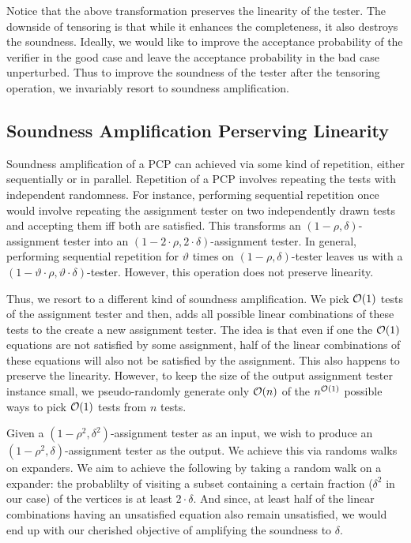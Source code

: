 \noindent Notice that the above transformation preserves the linearity
of the tester. The downside of tensoring is that while it enhances the
completeness, it also destroys the soundness. Ideally, we would like
to improve the acceptance probability of the verifier in the good case
and leave the acceptance probability in the bad case unperturbed. Thus
to improve the soundness of the tester after the tensoring operation,
we invariably resort to soundness amplification.

\subsection{Soundness Amplification Perserving Linearity}
Soundness amplification of a PCP can achieved via some kind of
repetition, either sequentially or in parallel. Repetition of a PCP
involves repeating the tests with independent randomness. For
instance, performing sequential repetition once would involve 
repeating the assignment tester on two independently drawn tests 
and accepting them iff both are satisfied. This transforms an $(1 - \rho,
\delta)$-assignment tester into an $(1 - 2 \cdot \rho ,2 \cdot
\delta)$-assignment tester. In general, performing sequential
repetition for $\vartheta$ times on $(1 - \rho , \delta)$-tester leaves us
with a $(1 - \vartheta \cdot \rho, \vartheta \cdot
\delta)$-tester. However, this operation does not preserve
linearity. 


Thus, we resort to a different kind of soundness amplification. We
pick ${\cal O}(1)$ tests of the assignment tester and then, adds all
possible linear combinations of these tests to the create a new
assignment tester. The idea is that even if one the ${\cal O}(1)$
 equations are not satisfied by some assignment, half of the linear
combinations of these equations will also not be satisfied by the
assignment. This also happens to preserve the linearity. However, to
keep the size of the output assignment tester instance small, we
pseudo-randomly generate only ${\cal O}(n)$ of the $n^{{\cal O}(1)}$
possible ways to pick ${\cal O}(1)$ tests from $n$ tests.

Given a $(1 - \rho^2, \delta^2)$-assignment tester as an input, we
wish to produce an $(1 - \rho^2, \delta)$-assignment tester as the
output. We achieve this via randoms walks on expanders. We aim to
achieve the following by taking a random walk on a expander: the
probablilty of visiting a subset containing a certain fraction
($\delta^2$ in our case) of the vertices is at least $2 \cdot
\delta$. And since, at least half of the linear combinations having an
unsatisfied equation also remain unsatisfied, we would end up with our
cherished objective of amplifying the soundness to $\delta$.

